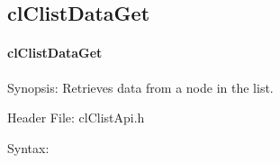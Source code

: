\begin{flushleft}
\subsection{clClistDataGet}
\hypertarget{pagecl112}{}\paragraph{cl\-Clist\-Data\-Get}\label{pagecl112}
\begin{Desc}
\item[Synopsis:]Retrieves data from a node in the list.\end{Desc}
\begin{Desc}
\item[Header File:]clClistApi.h\end{Desc}
\begin{Desc}
\item[Syntax:]


\end{Desc}
\end{flushleft}
